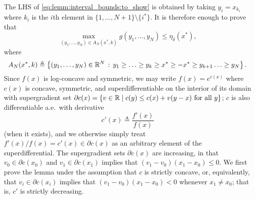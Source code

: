 \begin{proof-of-lemma}[\ref{lem:bound_intervals_delta}]
  The LHS of \eqref{eq:lemm:interval_bounds:to_show} is obtained by taking $y_i=x_{k_i}$ where $k_i$ is the $i$th element in $\{1,\ldots,N+1\}\setminus \{i^*\}$. It is therefore enough to prove that 
  \begin{equation*}
    \max_{(y_1,\ldots,y_N) \in A_N(x^*,k) } g(y_1,\ldots,y_N) \leq \eta_{\delta}(x^*),
  \end{equation*}
  where 
  \begin{equation*}
    A_N(x^*,k) \triangleq \left\{ (y_1,\ldots,y_N) \in \mathbb{R}^N\, : \, y_1 \ge \ldots \ge y_k \ge x^* \ge -x^* \ge y_{k+1} \ldots \ge y_N
    \right\}.
  \end{equation*}
  Since $f(x)$ is log-concave and symmetric, we may write $f(x) = e^{c(x)}$
  where $c(x)$ is concave, symmetric, and superdifferentiable on the interior
  of its domain with
  supergradient set $\partial c(x) = \{v \in \mathbb{R} \mid c(y) \le c(x) + v (y - x) ~
  \mbox{for~all}~ y\}$; $c$ is also
  differentiable a.e.\ with derivative
  \begin{equation*}
    c'(x) \triangleq \frac{f'(x)}{f(x)}
  \end{equation*}
  (when it exists), and we otherwise simply treat $f'(x) / f(x) = c'(x) \in
  \partial c(x)$ as an arbitrary element of the superdifferential.  The
  supergradient sets $\partial c(x)$ are increasing, in that $v_0 \in
  \partial c(x_0)$ and $v_1 \in \partial c(x_1)$ implies that $(v_1 - v_0)
  (x_1 - x_0) \le 0$.  We first prove the lemma under the assumption that
  $c$ is strictly concave, or, equivalently, that $v_i \in \partial c(x_i)$
  implies that $(v_1 - v_0)(x_1 - x_0) < 0$ whenever $x_1 \neq x_0$; that
  is, $c'$ is strictly decreasing.


\end{proof-of-lemma}
